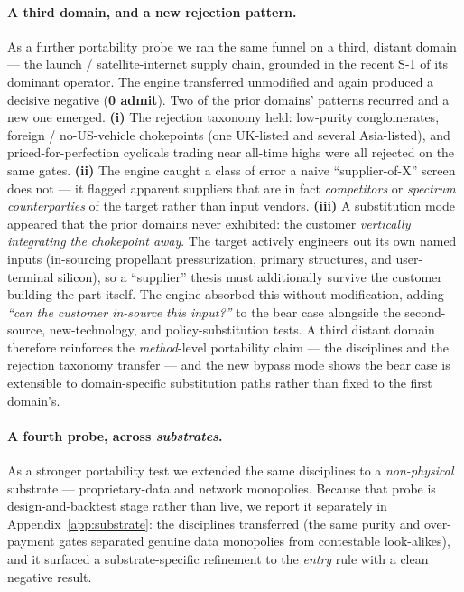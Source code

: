 \documentclass[11pt]{article}
\begin{document}
\paragraph{A third domain, and a new rejection pattern.} As a further portability
probe we ran the same funnel on a third, distant domain --- the launch /
satellite-internet supply chain, grounded in the recent S-1 of its dominant
operator. The engine transferred unmodified and again produced a decisive negative
(\textbf{0 admit}). Two of the prior domains' patterns recurred and a new one
emerged. \textbf{(i)} The rejection taxonomy held: low-purity conglomerates,
foreign / no-US-vehicle chokepoints (one UK-listed and several Asia-listed), and
priced-for-perfection cyclicals trading near all-time highs were all rejected on
the same gates. \textbf{(ii)} The engine caught a class of error a naive
``supplier-of-X'' screen does not --- it flagged apparent suppliers that are in
fact \emph{competitors} or \emph{spectrum counterparties} of the target rather than
input vendors. \textbf{(iii)} A substitution mode appeared that the prior domains
never exhibited: the customer \emph{vertically integrating the chokepoint away}.
The target actively engineers out its own named inputs (in-sourcing propellant
pressurization, primary structures, and user-terminal silicon), so a ``supplier''
thesis must additionally survive the customer building the part itself. The engine
absorbed this without modification, adding \emph{``can the customer in-source this
input?''} to the bear case alongside the second-source, new-technology, and
policy-substitution tests. A third distant domain therefore reinforces the
\emph{method}-level portability claim --- the disciplines and the rejection
taxonomy transfer --- and the new bypass mode shows the bear case is extensible to
domain-specific substitution paths rather than fixed to the first domain's.

\paragraph{A fourth probe, across \emph{substrates}.} As a stronger portability test we extended the
same disciplines to a \emph{non-physical} substrate --- proprietary-data and network monopolies.
Because that probe is design-and-backtest stage rather than live, we report it separately in
Appendix~\ref{app:substrate}: the disciplines transferred (the same purity and over-payment gates
separated genuine data monopolies from contestable look-alikes), and it surfaced a substrate-specific
refinement to the \emph{entry} rule with a clean negative result.
\end{document}
